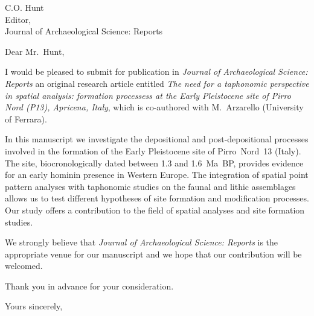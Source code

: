 \documentclass[version=last,a4paper]{scrlttr2}
\begin{document}
\begin{letter}{C.O. Hunt\\
Editor, \\
Journal of Archaeological Science: Reports}

  
\opening{Dear Mr.~Hunt,}

I would be pleased to submit for publication in \emph{Journal of Archaeological Science: Reports} an original research article entitled \emph{The need for a taphonomic perspective in spatial analysis: formation processess at the Early Pleistocene site of Pirro Nord (P13), Apricena, Italy}, which is co-authored with M.~Arzarello (University of Ferrara).

\vspace{0.1in}

In this manuscript we investigate the depositional and post-depositional processes involved in the formation of the Early Pleistocene site of Pirro~Nord~13 (Italy). The site, biocronologically dated between 1.3 and 1.6~Ma~BP, provides evidence for an early hominin presence in Western Europe.
The integration of spatial point pattern analyses with taphonomic studies on the faunal and lithic assemblages allows us to test different hypotheses of site formation and modification processes.
Our study offers a contribution to the field of spatial analyses and site formation studies.

\vspace{0.1in}

We strongly believe that \emph{Journal of Archaeological Science: Reports} is the appropriate venue for our manuscript and we hope that our contribution will be welcomed.

\vspace{0.1in}

Thank you in advance for your consideration.

\closing{Yours sincerely,}

\end{letter}
\end{document}
